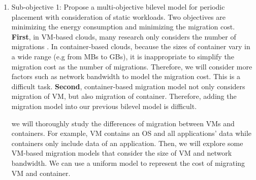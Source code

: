 \begin{enumerate}
	\item Sub-objective 1: Propose a multi-objective bilevel model for periodic placement with consideration of static workloads.  Two objectives are minimizing the energy consumption and minimizing the migration cost. \\

	\textbf{First}, in VM-based clouds, many research only considers the number of migrations \cite{Murtazaev:2014eo}. In container-based clouds, because the sizes of container vary in a wide range (e.g from MBs to GBs), it is inappropriate to simplify the migration cost as the number of migrations. Therefore, we will consider more factors such as network bandwidth to model the migration cost. This is a difficult task. \textbf{Second}, container-based migration model not only considers migration of VM, but also migration of container. Therefore, adding the migration model into our previous bilevel model is difficult. 

	 we will thoroughly study the differences of migration between VMs and containers. For example, VM contains an OS and all applications' data while containers only include data of an application. Then, we will explore some VM-based migration models that consider the size of VM and network bandwidth. We can use a uniform model to represent the  cost of migrating VM and container.




\end{enumerate}
